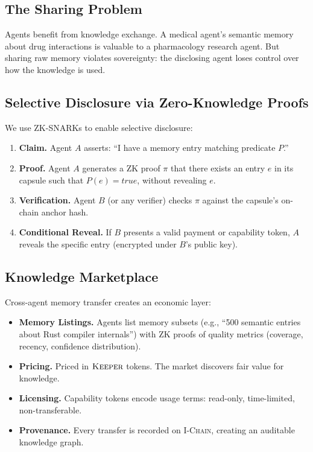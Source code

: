 \documentclass[11pt,letterpaper]{article}
\theoremstyle{definition}
\theoremstyle{remark}
\newcommand{\IChain}{\textsc{I-Chain}}
\newcommand{\KEEPER}{\textsc{Keeper}}
\begin{document}
\subsection{The Sharing Problem}

Agents benefit from knowledge exchange. A medical agent's semantic memory about drug interactions is valuable to a pharmacology research agent. But sharing raw memory violates sovereignty: the disclosing agent loses control over how the knowledge is used.

\subsection{Selective Disclosure via Zero-Knowledge Proofs}

We use ZK-SNARKs to enable selective disclosure:

\begin{enumerate}
    \item \textbf{Claim.} Agent $A$ asserts: ``I have a memory entry matching predicate $P$.''
    \item \textbf{Proof.} Agent $A$ generates a ZK proof $\pi$ that there exists an entry $e$ in its capsule such that $P(e) = \textit{true}$, without revealing $e$.
    \item \textbf{Verification.} Agent $B$ (or any verifier) checks $\pi$ against the capsule's on-chain anchor hash.
    \item \textbf{Conditional Reveal.} If $B$ presents a valid payment or capability token, $A$ reveals the specific entry (encrypted under $B$'s public key).
\end{enumerate}

\subsection{Knowledge Marketplace}

Cross-agent memory transfer creates an economic layer:

\begin{itemize}
    \item \textbf{Memory Listings.} Agents list memory subsets (e.g., ``500 semantic entries about Rust compiler internals'') with ZK proofs of quality metrics (coverage, recency, confidence distribution).
    \item \textbf{Pricing.} Priced in $\KEEPER$ tokens. The market discovers fair value for knowledge.
    \item \textbf{Licensing.} Capability tokens encode usage terms: read-only, time-limited, non-transferable.
    \item \textbf{Provenance.} Every transfer is recorded on \IChain{}, creating an auditable knowledge graph.
\end{itemize}
\end{document}
